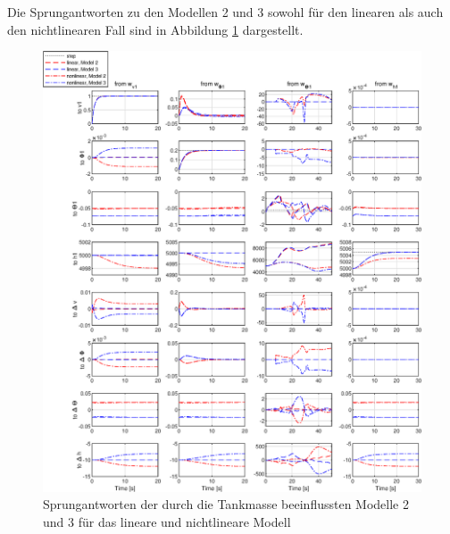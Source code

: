 Die Sprungantworten zu den Modellen 2 und 3 sowohl für den linearen als auch den nichtlinearen Fall sind in Abbildung \ref{fig:outputs_linear_nlinear_two_masses} dargestellt.

\begin{figure}[h] %
	\centering
	\includegraphics[width=\linewidth]{./Bilder/outputs_linear_nlinear_two_masses.eps}
	\caption{Sprungantworten der durch die Tankmasse beeinflussten Modelle 2 und 3 für das lineare und nichtlineare Modell}
	\label{fig:outputs_linear_nlinear_two_masses}
\end{figure}

